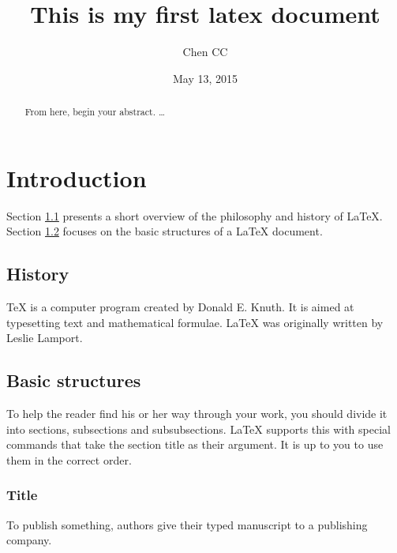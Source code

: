 \documentclass{article}
\begin{document}
\title{This is my first latex document}
\author{Chen CC}
\date{May 13, 2015}
\maketitle

\begin{abstract}
From here, begin your abstract. \ldots
\end{abstract}


\section{Introduction}

Section \ref{sec:history} presents a short overview of the philosophy and history of LaTeX. Section \ref{sec:basic} focuses on the basic structures of a LaTeX document.

\subsection{History}\label{sec:history}
TeX is a computer program created by Donald E. Knuth. It is aimed
at typesetting text and mathematical formulae. LaTeX was originally written by Leslie Lamport.

\subsection{Basic structures}\label{sec:basic}
To help the reader find his or her way through your work, you should divide
it into sections, subsections and subsubsections. LaTeX supports this with special commands that take the section title as their argument. It is up to you to use them in the correct order.
\subsubsection{Title}\label{sec:title}
To publish something, authors give their typed manuscript to a publishing
company.
\end{document}
